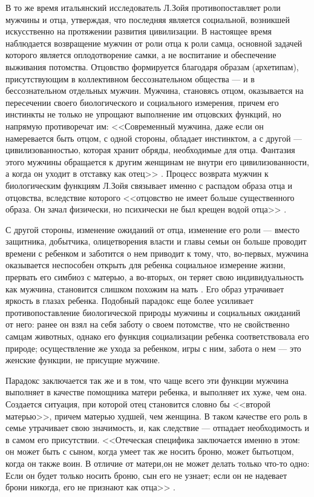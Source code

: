 \documentclass{../../common/thesisbyxetex}
\begin{document}
В то же время итальянский исследователь Л.Зойя противопоставляет роли
мужчины и отца, утверждая, что последняя является социальной,
возникшей искусственно на протяжении развития цивилизации. В настоящее время наблюдается
возвращение мужчин от роли отца к роли самца, основной задачей которого является оплодотворение
самки, а не воспитание и обеспечение выживания потомства. Отцовство формируется благодаря
образам (архетипам), присутствующим в коллективном бессознательном общества --- и в
бессознательном отдельных мужчин. Мужчина, становясь отцом, оказывается на пересечении
своего биологического и социального измерения, причем его инстинкты не только не упрощают
выполнение им отцовских функций, но напрямую противоречат им: <<Современный мужчина, даже
если он намеревается быть отцом, с одной стороны, обладает инстинктом, а с другой ---
цивилизованностью, которая хранит обряды, необходимые для отца. Фантазия этого мужчины
обращается к другим женщинам не внутри его цивилизованности, а когда он уходит в отставку
как отец>> \cite[270]{zo}. Процесс возврата мужчин к биологическим функциям Л.Зойя связывает
именно с распадом образа отца и отцовства, вследствие которого <<отцовство не имеет больше
существенного образа. Он зачал физически, но психически не был крещен водой отца>> \cite[270]{zo}.

С другой стороны, изменение ожиданий от отца, изменение его роли --- вместо защитника, добытчика,
олицетворения власти и главы семьи он больше проводит времени с ребенком и заботится о нем
приводит к тому, что, во-первых, мужчина оказывается неспособен открыть для ребенка социальное
измерение жизни, прервать его симбиоз с матерью, а во-вторых, он теряет свою индивидуальность как
мужчина, становится слишком похожим на мать \cite[285]{zo}. Его образ утрачивает
яркость в глазах ребенка. Подобный парадокс еще более усиливает противопоставление биологической
природы мужчины и социальных ожиданий от него: ранее он взял на себя заботу о своем потомстве, что
не свойственно самцам животных, однако его функция социализации ребенка соответствовала его
природе; осуществление же ухода за ребенком, игры  с ним, забота о нем --- это женские функции, не
присущие мужчине.

Парадокс заключается так же и в том, что чаще всего эти функции мужчина выполняет в качестве
помощника матери ребенка, и выполняет их хуже, чем она. Создается ситуация, при
которой отец становится словно бы <<второй матерью>>, причем матерью худшей, чем женщина. В таком
качестве его роль в семье утрачивает свою значимость, и, как следствие --- отпадает
необходимость и в самом его присутствии. <<Отеческая специфика заключается именно в этом: он может
быть с сыном, когда умеет так же носить
броню, может бытьотцом, когда он также воин. В отличие от матери,он не может делать только
что-то одно: Если он будет только носить броню, сын его не узнает; если он не надевает брони
никогда, его не признают как отца>> \cite[287]{zo}.
\end{document}

